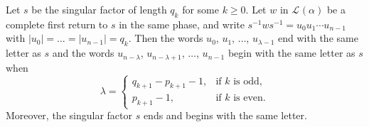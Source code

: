 \documentclass[a4paper,fleqn]{article}
\providecommand{\abs}[1]{\lvert#1\rvert}
\newcommand{\Lang}[2][]{\mathcal{L}_{#1}(#2)}
\begin{document}
  \begin{lemma}\label{lem:first_last_letter}
    Let $s$ be the singular factor of length $q_k$ for some $k \geq 0$. Let $w$ in $\Lang{\alpha}$ be a complete first
    return to $s$ in the same phase, and write $s^{-1}ws^{-1} = u_0 u_1 \dotsm u_{n - 1}$ with
    $\abs{u_0} = \ldots = \abs{u_{n - 1}} = q_k$. Then the words $u_0$, $u_1$, $\ldots$, $u_{\lambda-1}$ end with the
    same letter as $s$ and the words $u_{n - \lambda}$, $u_{n - \lambda + 1}$, $\ldots$, $u_{n - 1}$ begin with the
    same letter as $s$ when
    \begin{equation*}
      \lambda = \begin{cases}
                  q_{k+1} - p_{k+1} - 1, &\text{if $k$ is odd}, \\
                  p_{k+1} - 1,           &\text{if $k$ is even}.
                \end{cases}
    \end{equation*}
    Moreover, the singular factor $s$ ends and begins with the same letter.
  \end{lemma}
\end{document}
